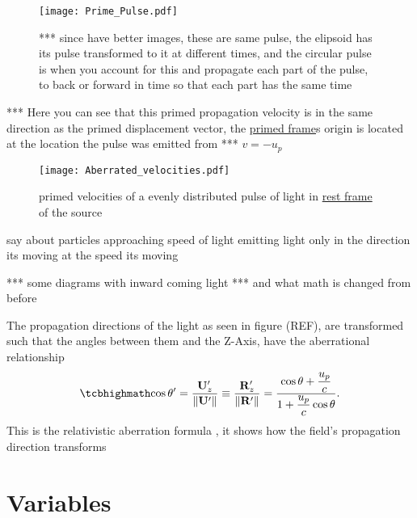 \begin{figure}[H]
\centering
       \texttt{[image: Prime\_Pulse.pdf]}
    \caption{*** since have better images, these are same pulse, the elipsoid has its pulse transformed to it at different times, and the circular pulse is when you account for this and propagate each part of the pulse, to back or forward in time so that each part has the same time}
    \label{fig: Prime Pulse}
\end{figure}

*** Here you can see that this primed propagation velocity is in the same direction as the primed displacement vector, the \hyperlink{def-Primed-Frame}{primed frame}s origin is located at the location the pulse was emitted from \newline
*** $v=-u_p$ 


\begin{figure}[ht]
\centering
       \texttt{[image: Aberrated\_velocities.pdf]}
    \caption{primed velocities of a evenly distributed pulse of light in \protect\hyperlink{def-proper-frame}{rest frame} of the source}
\end{figure}

say about particles approaching speed of light emitting light only in the direction its moving at the speed its moving

*** some diagrams with inward coming light ***
and what math is changed from before



The propagation directions of the light as seen in figure (REF), are transformed such that the angles between them and the Z-Axis, have the aberrational relationship
\begin{equation}%
\label{Cosine transform}
\mhl{
    \cos\theta' = \frac{\mathbf{U}'_z}{\|\mathbf{U}'\|} \equiv \frac{\mathbf{R}'_{z}}{\|\mathbf{R}'\|} =  \dfrac{\cos\theta + \dfrac{u_p}{c}}{1+\dfrac{u_p}{c}\cos\theta}.
    }
\end{equation}%
This is the relativistic aberration formula \cite{einstein1905electrodynamics}, it shows how the field's propagation direction transforms

\section{Variables}

